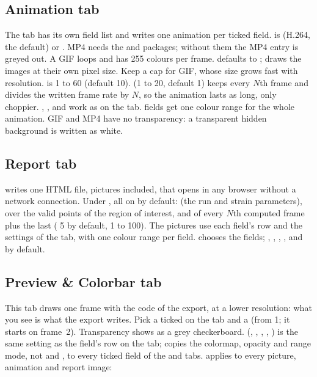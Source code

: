 \subsection{Animation tab}

The  tab has its own field list and writes one animation per ticked field.
 is  (H.264, the default) or . MP4 needs the  and
 packages; without them the MP4 entry is greyed out. A GIF loops and has 255 colours
per frame.  defaults to \ui{1024 px};  draws the images at their own pixel size.
Keep a cap for GIF, whose size grows fast with resolution.  is 1 to 60 (default 10).
 (1 to 20, default 1) keeps every $N$th frame and divides the written frame rate by
$N$, so the animation lasts as long, only choppier. , ,
 and  work as on the  tab.  fields
get one colour range for the whole animation. GIF and MP4 have no transparency: a transparent
hidden background is written as white.

\subsection{Report tab}

 writes one HTML file, pictures included, that opens in any browser without a
network connection. Under , all on by default:  (the run and
strain parameters),  over the valid points of the
region of interest, and  of every $N$th computed frame plus the last
( 5  by default, 1 to 100). The pictures use each field's row and the
settings of the  tab, with one colour range per field.  chooses the fields;
, , , ,  and  by default.

\subsection{Preview \& Colorbar tab}

This tab draws one frame with the code of the  export, at a lower resolution: what you
see is what the export writes. Pick a  ticked on the  tab and a 
(from 1; it starts on frame~2). Transparency shows as a grey checkerboard. 
(, , , , ) is the same setting as the field's
row on the  tab;  copies the colormap, opacity and range mode,
not  and , to every ticked field of the  and  tabs.
 applies to every picture, animation and report image:

